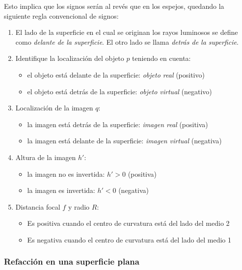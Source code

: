 \noindent Esto implica que los signos serán al revés que en los espejos, quedando la siguiente regla convencional de signos:
\begin{enumerate}
  \item El lado de la superficie en el cual se originan los rayos luminosos se define como \textit{delante de la superficie}. El otro lado se llama \textit{detrás de la superficie}.
  \item Identifique la localización del objeto \(p\) teniendo en cuenta:
    \begin{itemize}
      \item el objeto está delante de la superficie: \textit{objeto real} (positivo)
      \item el objeto está detrás de la superficie: \textit{objeto virtual} (negativo)
    \end{itemize}
  \item  Localización de la imagen \(q\):
    \begin{itemize}
      \item la imagen está detrás de la superficie: \textit{imagen real} (positiva)
      \item la imagen está delante de la superficie: \textit{imagen virtual} (negativa)
    \end{itemize}
  \item Altura de la imagen \(h'\):
    \begin{itemize}
      \item la imagen no es invertida: \(h' > 0\) (positiva)
      \item la imagen es invertida: \(h' < 0\) (negativa)
    \end{itemize}
  \item Distancia focal \(f\) y radio \(R\):
    \begin{itemize}
      \item Es positiva cuando el centro de curvatura está del lado del medio 2
      \item Es negativa cuando el centro de curvatura está del lado del medio 1
    \end{itemize}
\end{enumerate}

\subsubsection{Refacción en una superficie plana}

